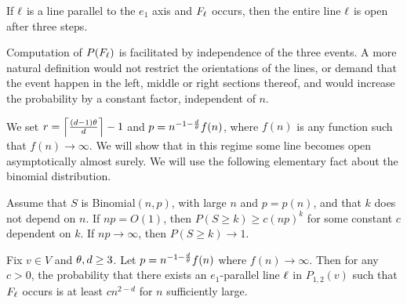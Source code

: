 \begin{lemma} \label{twostep}
If $\ell$ is a line parallel to the $e_1$ axis and $F_\ell$ occurs,
then the entire line $\ell$ is open after three steps.
\end{lemma}
\begin{comment}
\begin{proof}
If $v \in \Ln_m$ 
and the event
$$\I{\Ln_l}{\noodle}\bigcap\I{\Ln_2(v)}{\threshold-\noodle}$$
occurs then $v$ has at least $\threshold$ neighbors initially open and $v$ is open after one step. Then there are at least $\noodle +1$ sites open in $\Ln_l \cup \Ln_m$ after one step. Thus if $F_\Ln$
occurs there are at least $\threshold$ vertices in $\Ln_r$ that are
open after two steps. Thus the entire line $\Ln$ is open after 
three steps.
\end{proof}
\end{comment}

\begin{remark} Computation of 
$P(F_\ell)$ is facilitated by independence of the three events. 
A more natural definition would not restrict the orientations of the lines, or 
demand that the event happen in the left, middle or right sections thereof, and would increase the probability by a constant factor, independent of $n$.
\end{remark}


We set $r =\left\lceil \frac{(d-1)\theta}{d} \right\rceil -1$ and  $p = n^{-1-\frac{d}{\theta}}f(n)$, where $f(n)$ is any function such that $f(n) \to \infty$. 
We will show that in this regime some line becomes open asymptotically almost surely.
We will use the following elementary fact about the binomial distribution. 

\begin{lemma} \label{binomlemma}
Assume that $S$ is Binomial$(n,p)$, with large $n$ and $p=p(n)$, and that $k$ does not depend on $n$. 
If $np=O(1)$, then $P(S\ge k)\ge c (np)^k$ for some constant $c$ dependent on $k$. 
If $np\to\infty$, then  $P(S\ge k)\to 1$.
\end{lemma}



\begin{lemma} \label{probA}
Fix $v \in V$ and $ \theta, d \geq 3$. Let $p=n^{-1-\frac{d}{\theta}}f(n)$ where $f(n) \to \infty$. Then for any $c>0$, the probability that there exists an $e_1$-parallel line $\ell$ in $P_{1,2}(v)$ such that $F_\ell$ occurs
is at least  $cn^{2-d}$ for $n$ sufficiently large.
\end{lemma}

